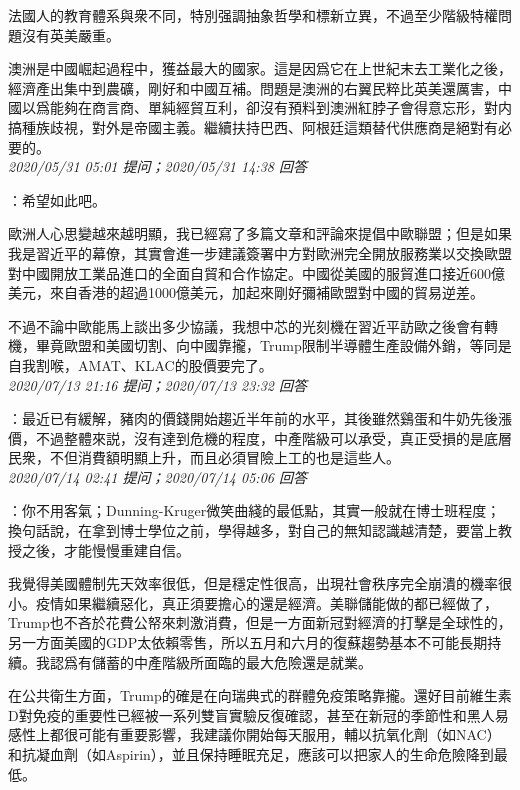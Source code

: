 \documentclass[twocolumn]{ctexart}
\begin{document}
法國人的教育體系與衆不同，特別强調抽象哲學和標新立異，不過至少階級特權問題沒有英美嚴重。

澳洲是中國崛起過程中，獲益最大的國家。這是因爲它在上世紀末去工業化之後，經濟產出集中到農礦，剛好和中國互補。問題是澳洲的右翼民粹比英美還厲害，中國以爲能夠在商言商、單純經貿互利，卻沒有預料到澳洲紅脖子會得意忘形，對内搞種族歧視，對外是帝國主義。繼續扶持巴西、阿根廷這類替代供應商是絕對有必要的。
\\

\textit{\hfill\noindent\small 2020/05/31 05:01 提问；2020/05/31 14:38 回答}

：希望如此吧。

歐洲人心思變越來越明顯，我已經寫了多篇文章和評論來提倡中歐聯盟；但是如果我是習近平的幕僚，其實會進一步建議簽署中方對歐洲完全開放服務業以交換歐盟對中國開放工業品進口的全面自貿和合作協定。中國從美國的服貿進口接近600億美元，來自香港的超過1000億美元，加起來剛好彌補歐盟對中國的貿易逆差。

不過不論中歐能馬上談出多少協議，我想中芯的光刻機在習近平訪歐之後會有轉機，畢竟歐盟和美國切割、向中國靠攏，Trump限制半導體生產設備外銷，等同是自我割喉，AMAT、KLAC的股價要完了。
\\

\textit{\hfill\noindent\small 2020/07/13 21:16 提问；2020/07/13 23:32 回答}

：最近已有緩解，豬肉的價錢開始趨近半年前的水平，其後雖然鷄蛋和牛奶先後漲價，不過整體來説，沒有達到危機的程度，中產階級可以承受，真正受損的是底層民衆，不但消費額明顯上升，而且必須冒險上工的也是這些人。
\\

\textit{\hfill\noindent\small 2020/07/14 02:41 提问；2020/07/14 05:06 回答}

：你不用客氣；Dunning-Kruger微笑曲綫的最低點，其實一般就在博士班程度；換句話說，在拿到博士學位之前，學得越多，對自己的無知認識越清楚，要當上教授之後，才能慢慢重建自信。

我覺得美國體制先天效率很低，但是穩定性很高，出現社會秩序完全崩潰的機率很小。疫情如果繼續惡化，真正須要擔心的還是經濟。美聯儲能做的都已經做了，Trump也不吝於花費公帑來刺激消費，但是一方面新冠對經濟的打擊是全球性的，另一方面美國的GDP太依賴零售，所以五月和六月的復蘇趨勢基本不可能長期持續。我認爲有儲蓄的中產階級所面臨的最大危險還是就業。

在公共衛生方面，Trump的確是在向瑞典式的群體免疫策略靠攏。還好目前維生素D對免疫的重要性已經被一系列雙盲實驗反復確認，甚至在新冠的季節性和黑人易感性上都很可能有重要影響，我建議你開始每天服用，輔以抗氧化劑（如NAC）和抗凝血劑（如Aspirin），並且保持睡眠充足，應該可以把家人的生命危險降到最低。
\end{document}
